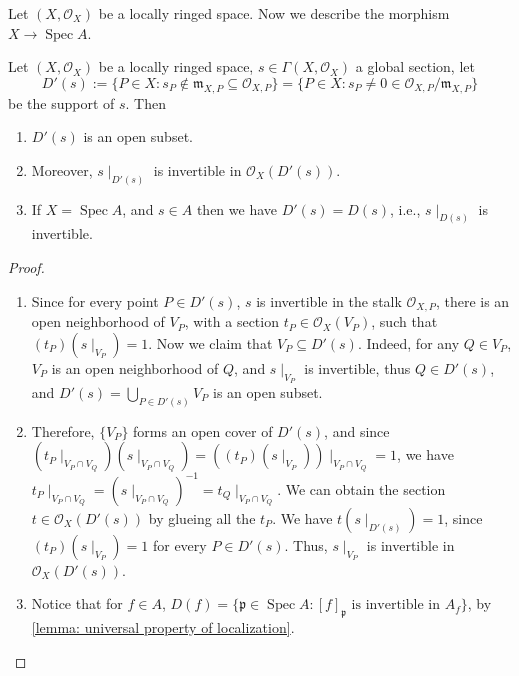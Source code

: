 \documentclass[11pt]{article}
\newcommand{\Spec}{\operatorname{Spec}}
\begin{document}
Let $ (X, \mathscr{O}_{X}) $ be a locally ringed space. 
Now we describe the morphism $ X \to \Spec A $. 

\begin{lemma}
    \cite[\href{https://stacks.math.columbia.edu/tag/01HZ}{Lemma 01HZ}]{stacks}
    Let $(X,\mathscr{O}_{X})$ be a locally ringed space, 
    $s \in \Gamma(X,\mathscr{O}_{X})$ a global section, 
    let 
    $$D'(s):=\{P \in X:s_{P} \notin \mathfrak{m}_{X,P} \subseteq \mathscr{O}_{X,P}\}
    =\{P \in X:s_{P} \neq0 \in \mathscr{O}_{X,P} / \mathfrak{m}_{X,P}\}$$
    be the support of $ s $. 
    Then 
    \begin{enumerate}[label = (\alph*)]
        \item $ D'(s) $ is an open subset. 
        \item Moreover, $ s \mid_{D'(s)} $ is invertible in $ \mathscr{O}_{X}(D'(s)) $. 
        \item If $ X = \Spec A $, and $ s \in A $ then we have $ D'(s)=D(s) $, 
        i.e., $ s \mid_{D(s)} $ is invertible. 
    \end{enumerate}
\end{lemma}

\begin{proof}
    \begin{enumerate}[label = (\alph*)]
        \item Since for every point $P \in D'(s)$, $ s $ is invertible in the stalk $\mathscr{O}_{X,P}$, 
        there is an open neighborhood of $V_{P}$, 
        with a section $t_{P} \in \mathscr{O}_{X}(V_{P})$, such that $(t_{P})(s\mid_{V_{P}})=1$. 
        Now we claim that $V_{P} \subseteq D'(s)$. 
        Indeed, for any $Q \in V_{P}$, $V_{P}$ is an open neighborhood of $Q$, 
        and $s\mid_{V_{P}}$ is invertible, thus $Q \in D'(s)$, 
        and $D'(s)=\bigcup\limits_{P \in D'(s)} V_{P}$ is an open subset. 


        \item  Therefore, $\{V_{P}\}$ forms an open cover of $D'(s)$, 
        and since $(t_{P}\mid_{V_{P} \cap V_{Q}})(s\mid_{V_{P}\cap V_{Q}})=((t_{P}) (s\mid_{V_{P}}))\mid_{V_{P} \cap V_{Q}}=1$, 
        we have $t_{P}\mid_{V_{P}\cap V_{Q}}=(s\mid_{V_{P}\cap V_{Q}})^{-1}=t_{Q}\mid_{V_{P}\cap V_{Q}}$. 
        We can obtain the section $t \in \mathscr{O}_{X}(D'(s))$ by 
        glueing all the $t_{P}$. 
        We have $t(s\mid_{D'(s)})=1$, since $(t_{P})(s\mid_{V_{P}})=1$ for every $P \in D'(s)$. 
        Thus, $s\mid_{V_{P}}$ is invertible in $\mathscr{O}_{X}(D'(s))$. 
        

        \item Notice that for $ f \in A $, 
        $ D(f) = \{ \mathfrak{p} \in \Spec A: [f]_{\mathfrak{p}} \text{ is invertible in } A_{f}\} $, 
        by \autoref{lemma: universal property of localization}. 
    \end{enumerate}
\end{proof}
\end{document}
